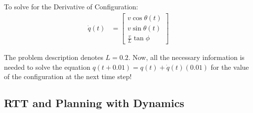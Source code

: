 \documentclass{article}
\begin{document}
To solve for the Derivative of Configuration: \newline 
\begin{align}
    \dot{q}(t) &= \begin{bmatrix}
           v\cos{\theta(t)} \\
           v\sin{\theta(t)} \\
           \frac{v}{L} \tan{\phi}
         \end{bmatrix}
\end{align}

The problem description denotes $L = 0.2$. Now, all the necessary information is needed to solve the equation $q(t + 0.01) = q(t) + \dot{q}(t) (0.01)$ for the value of the configuration at the next time step! 
\subsection{RTT and Planning with Dynamics}
\end{document}
